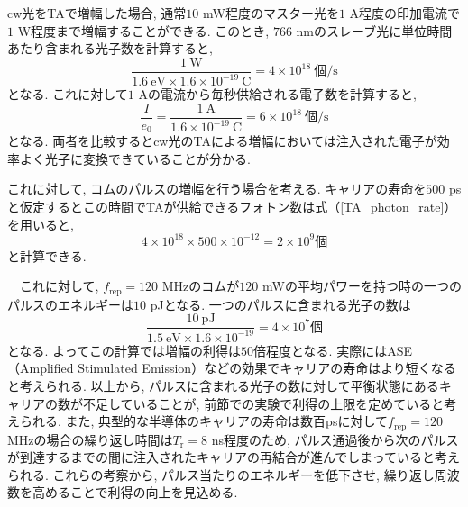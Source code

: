\documentclass[uplatex, dvipdfmx, a4paper, report, papersize, 11pt]{jsbook}
\begin{document}
cw光をTAで増幅した場合, 通常$10$ mW程度のマスター光を$1$ A程度の印加電流で$1$ W程度まで増幅することができる. このとき, $766$ nmのスレーブ光に単位時間あたり含まれる光子数を計算すると,
\begin{equation}\label{TA_photon_rate}
  \frac{1\ \mathrm{W}}{1.6\ \mathrm{eV}\times1.6\times10^{-19}\ \mathrm{C}} = 4\times10^{18}\ 個\mathrm{/s}
\end{equation}
となる. これに対して$1$ Aの電流から毎秒供給される電子数を計算すると,
\begin{equation}
  \frac{I}{e_0} = \frac{1\ \mathrm{A}}{1.6\times10^{-19}\ \mathrm{C}} = 6\times10^{18}\ 個\mathrm{/s}
\end{equation}
となる. 両者を比較するとcw光のTAによる増幅においては注入された電子が効率よく光子に変換できていることが分かる. \par
これに対して, コムのパルスの増幅を行う場合を考える. キャリアの寿命を$500$ psと仮定するとこの時間でTAが供給できるフォトン数は式（\ref{TA_photon_rate}）を用いると,
\begin{equation}
  4\times10^{18}\times500\times10^{-12} = 2\times10^9 個
\end{equation}
と計算できる. \par
　これに対して, $f_{\mathrm{rep}} = 120$ MHzのコムが$120$ mWの平均パワーを持つ時の一つのパルスのエネルギーは$10$ pJとなる. 一つのパルスに含まれる光子の数は
\begin{equation}
  \frac{10\ \mathrm{pJ}}{1.5\ \mathrm{eV}\times1.6\times10^{-19}} = 4\times10^7 個
\end{equation}
となる. よってこの計算では増幅の利得は$50$倍程度となる. 実際にはASE（Amplified Stimulated Emission）などの効果でキャリアの寿命はより短くなると考えられる. 以上から, パルスに含まれる光子の数に対して平衡状態にあるキャリアの数が不足していることが, 前節での実験で利得の上限を定めていると考えられる. また, 典型的な半導体のキャリアの寿命は数百psに対して$f_{\mathrm{rep}} = 120$ MHzの場合の繰り返し時間は$T_\mathrm{r} = 8$ ns程度のため, パルス通過後から次のパルスが到達するまでの間に注入されたキャリアの再結合が進んでしまっていると考えられる. これらの考察から, パルス当たりのエネルギーを低下させ, 繰り返し周波数を高めることで利得の向上を見込める.
\end{document}
